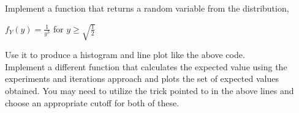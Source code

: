 \documentclass[answers]{exam}
\begin{document}
\subsection{} Implement a function that returns a random variable from the distribution, \\
\begin{center}
    $f_Y(y) = \frac{1}{y^3}$ for $y \geq \sqrt{\frac{1}{2}}$ 
\end{center}
Use it to produce a histogram and line plot like the above code.\\
Implement a different function that calculates the expected value using the experiments and iterations
approach and plots the set of expected values obtained. You may need to utilize the trick pointed to
in the above lines and choose an appropriate cutoff for both of these.\\
\end{document}
